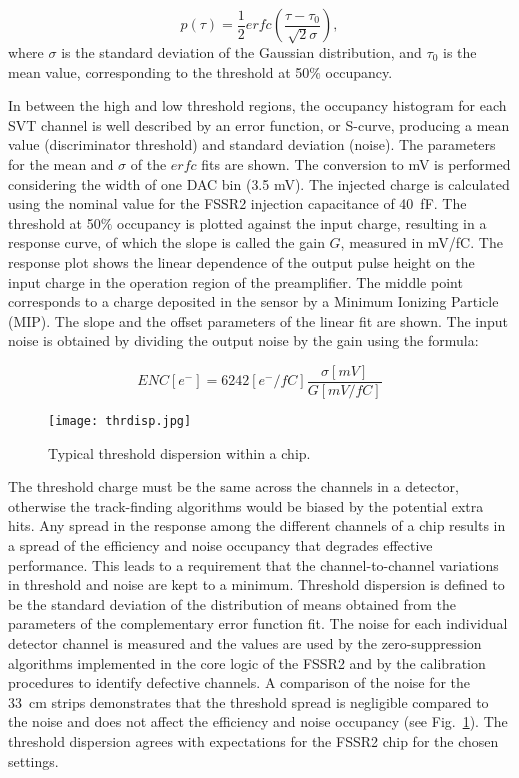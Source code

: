 \begin{equation} p(\tau)=\frac{1}{2} erfc(\frac{\tau - \tau_{0}}{\sqrt{2}\sigma})  \label{eq:erfc},
\end{equation}
where $\sigma$ is the standard deviation of the Gaussian distribution, and $\tau_{0}$ is the mean value, corresponding to the threshold at 50$\%$ occupancy.

In between the high and low threshold regions, the occupancy histogram for each SVT channel is well described by an error function, or S-curve, producing a mean value (discriminator threshold) and standard deviation (noise). The parameters for the mean and $\sigma$ of the $erfc$ fits are shown. The conversion to mV is performed considering the width of one DAC bin (3.5 mV). The injected charge is calculated using the nominal value for the FSSR2 injection capacitance of 40~fF. The threshold at 50$\%$ occupancy is plotted against the input charge, resulting in a response curve, of which the slope is called the gain $G$, measured in mV/fC. The response plot shows the linear dependence of the output pulse height on the input charge in the operation region of the preamplifier. The middle point corresponds to a charge deposited in the sensor by a Minimum Ionizing Particle (MIP). The slope and the offset parameters of the linear fit are shown. The input noise is obtained by dividing the output noise by the gain using the formula:

\begin{equation} ENC[e^{-}]=6242[e^{-}/fC]\frac{\sigma[mV]}{G[mV/fC]}  \label{eq:enc}
\end{equation}



\begin{figure}[hbt] 
	\centering 
	\texttt{[image: thrdisp.jpg]}
	\caption{Typical threshold dispersion within a chip.}
	\label{fig:thrdisp}
\end{figure}

The threshold charge must be the same across the channels in a detector, otherwise the track-finding algorithms would be biased by the potential extra hits. Any spread in the response among the different channels of a chip results in a spread of the efficiency and noise occupancy that degrades effective performance. This leads to a requirement that the channel-to-channel variations in threshold and noise are kept to a minimum. Threshold dispersion is defined to be the standard deviation of the distribution of means obtained from the parameters of the complementary error function fit. The noise for each individual detector channel is measured and the values are used by the zero-suppression algorithms implemented in the core logic of the FSSR2 and by the calibration procedures to identify defective channels. A comparison of the noise for the 33~cm strips demonstrates that the threshold spread is negligible compared to the noise and does not affect the efficiency and noise occupancy (see Fig.~\ref{fig:thrdisp}). The threshold dispersion agrees with expectations for the FSSR2 chip for the chosen settings.

